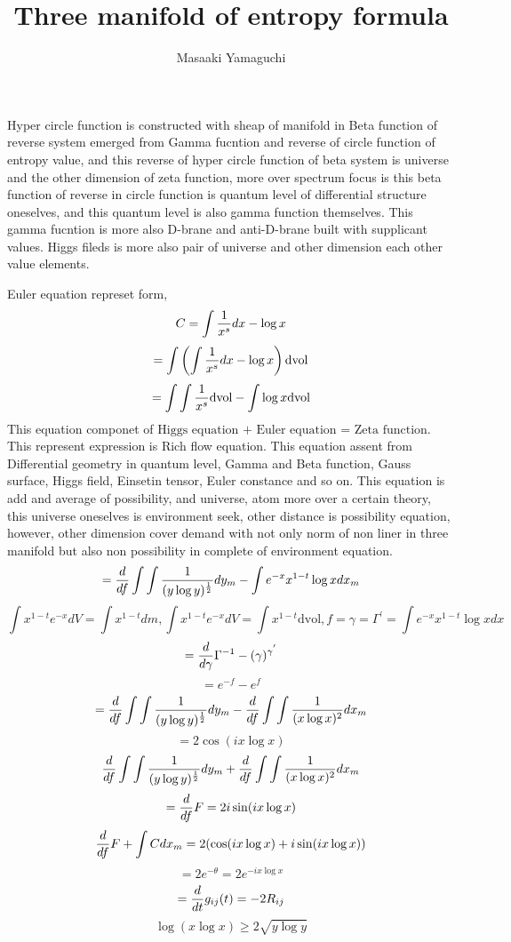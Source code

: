 \documentclass{jsarticle}
\begin{document}
    Hyper circle function is constructed with sheap of manifold in 
    Beta function of reverse system emerged from Gamma fucntion 
    and reverse of circle function of entropy value,
    and this reverse of hyper circle function of beta system
    is universe and the other dimension of zeta function,
    more over spectrum focus is this beta function of reverse in
    circle function is quantum level of differential structure oneselves,
    and this quantum level is also gamma function themselves.
    This gamma fucntion is more also D-brane and anti-D-brane built 
    with supplicant values. Higgs fileds is more also pair of universe and
    other dimension each other value elements. 

\newpage
\title{Three manifold of entropy formula}
\author{Masaaki Yamaguchi}

  Euler equation represet form,
  $$ C = \int {1 \over x^s}dx - \log x $$
  $$ = \int \left(\int {1 \over x^s}dx - \log x \right)\mathrm{dvol} $$
  $$ = \int \int{1 \over x^s}\mathrm{dvol} - \int  \log x \mathrm{dvol} $$
  This equation componet of $ \text{Higgs equation + Euler equation =
  Zeta function} $. This represent expression is Rich flow equation.
  This equation assent from Differential geometry in quantum level,
  Gamma and Beta function, Gauss surface, Higgs field, Einsetin tensor,
  Euler constance and so on.
    This equation is add and average of possibility, and universe, atom
  more over a certain theory, this universe oneselves is environment
  seek, other distance is possibility equation, however, other dimension
  cover demand with not only norm of non liner in three manifold
  but also non possibility in complete of environment equation.
    $$ = {d \over df} \int \int{1 \over (y \log y)^{1 \over 2}}dy_m 
  - \int e^{-x}x^{1 - t} \log x dx_m $$
  $$ \int x^{1 - t}e^{-x}dV = \int x^{1 - t}dm, \int x^{1 - t}e^{-x}dV
  = \int x^{1 - t}\mathrm{dvol}, f = \gamma = \Gamma^{'} = \int 
  e^{-x}x^{1 - t} \log x dx $$
  $$ = {d \over d \gamma}\Gamma^{-1} - (\gamma)^{\gamma^{'}} $$
  $$ = e^{-f} - e^{f} $$
  $$ = {d \over df}\int \int{1 \over (y \log y)^{1 \over 2}}dy_m
  - {d \over df}\int\int {1 \over (x \log x)^2}dx_m $$
  $$ = 2 \cos (i x \log x) $$
  $$  {d \over df}\int\int{1 \over (y \log y)^{1 \over 2}}dy_m
  + {d \over df}\int\int{1 \over (x \log x)^2}dx_m $$
  $$ = {d \over df}F = 2 i \sin (i x \log x) $$
  $$ {d \over df}F + \int C dx_m  
  = 2 (\cos( i x \log x) + i \sin(i x \log x)) $$
  $$ = 2 e^{- \theta} = 2 e^{- i x \log x} $$
  $$ = {d \over dt}g_{ij}(t) = - 2 R_{ij} $$
  $$ \log (x \log x) \ge 2 \sqrt{y \log y} $$
\end{document}
